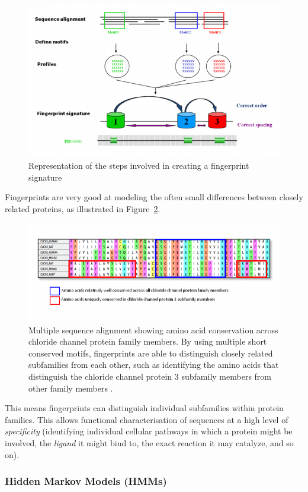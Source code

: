\documentclass{article}
\begin{document}
\begin{figure}[h!]
\centering
\includegraphics[width=.75\textwidth]{fingerprints1.png}
\caption{Representation of the steps involved in creating a fingerprint signature}
\label{fig:fingerprints1}
\end{figure}

Fingerprints are very good at modeling the often small differences between closely related proteins, as illustrated in Figure~\ref{fig:fingerprints2}.

\begin{figure}[h!]
\centering
\includegraphics[width=.75\textwidth]{fingerprints2.png}
\caption{Multiple sequence alignment showing amino acid conservation across chloride channel protein family members. By using multiple short conserved motifs, fingerprints are able to distinguish closely related subfamilies from each other, such as identifying the amino acids that distinguish the chloride channel protein 3 subfamily members from other family members \cite{EBI}.}
\label{fig:fingerprints2}
\end{figure}

This means fingerprints can distinguish individual subfamilies within protein families. This allows functional characterisation of sequences at a high level of {\em specificity} (identifying individual cellular pathways in which a protein might be involved, the {\em ligand} it might bind to, the exact reaction it may catalyze, and so on). 



\subsubsection*{Hidden Markov Models (HMMs)}
\end{document}

